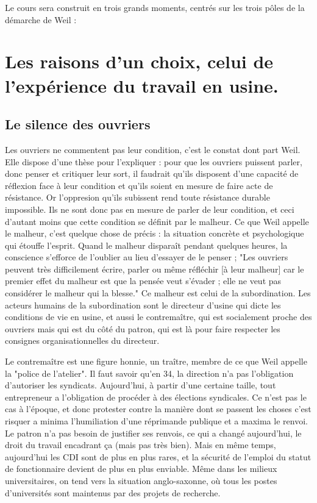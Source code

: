 \documentclass[a4paper,12pt]{book}
\begin{document}
\par Le cours sera construit en trois grands moments, centrés sur les trois pôles de la démarche de Weil :

\section{Les raisons d'un choix, celui de l'expérience du travail en usine.}
\subsection{Le silence des ouvriers}
Les ouvriers ne commentent pas leur condition, c'est le constat dont part Weil. Elle dispose d'une thèse pour l'expliquer : pour que les ouvriers puissent parler, donc penser et critiquer leur sort, il faudrait qu'ils disposent d'une capacité de réflexion face à leur condition et qu'ils soient en mesure de faire acte de résistance. Or l'oppresion qu'ils subissent rend toute résistance durable impossible. Ils ne sont donc pas en mesure de parler de leur condition, et ceci d'autant moins que cette condition se définit par le malheur. Ce que Weil appelle le malheur, c'est quelque chose de précis : la situation concrète et psychologique qui étouffe l'esprit. Quand le malheur disparaît pendant quelques heures, la conscience s'efforce de l'oublier au lieu d'essayer de le penser ; "Les ouvriers peuvent très difficilement écrire, parler ou même réfléchir [à leur malheur] car le premier effet du malheur est que la pensée veut s'évader ; elle ne veut pas considérer le malheur qui la blesse." Ce malheur est celui de la subordination. Les acteurs humains de la subordination sont le directeur d'usine qui dicte les conditions de vie en usine, et aussi le contremaître, qui est socialement proche des ouvriers mais qui est du côté du patron, qui est là pour faire respecter les consignes organisationnelles du directeur.
\par Le contremaître est une figure honnie, un traître, membre de ce que Weil appelle la "police de l'atelier". Il faut savoir qu'en 34, la direction n'a pas l'obligation d'autoriser les syndicats. Aujourd'hui, à partir d'une certaine taille, tout entrepreneur a l'obligation de procéder à des élections syndicales. Ce n'est pas le cas à l'époque, et donc protester contre la manière dont se passent les choses c'est risquer a minima l'humiliation d'une réprimande publique et a maxima le renvoi. Le patron n'a pas besoin de justifier ses renvois, ce qui a changé aujourd'hui, le droit du travail encadrant ça (mais pas très bien). Mais en même temps, aujourd'hui les CDI sont de plus en plus rares, et la sécurité de l'emploi du statut de fonctionnaire devient de plus en plus enviable. Même dans les milieux universitaires, on tend vers la situation anglo-saxonne, où tous les postes d'universités sont maintenus par des projets de recherche.
\end{document}

